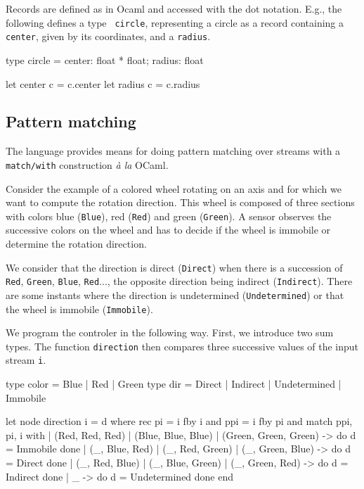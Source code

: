 \documentclass[11pt,titlepage,twoside]{report}
\newcommand{\ocaml}{{\sf OCaml}}
\begin{document}
Records are defined as in Ocaml and accessed with the dot notation. E.g.,
the following defines a type {\tt
  circle}, representing a circle as a record containing a {\tt
  center}, given by its coordinates, and a {\tt radius}.
\begin{chklisting}
type circle = { center: float * float; radius: float }

let center c = c.center
let radius c = c.radius
\end{chklisting}
  
\subsection{Pattern matching\label{patternmatch}} %

The language provides means for doing pattern matching over streams
with a \verb-match/with- construction {\em \`a la} \ocaml.

Consider the example of a colored wheel rotating on an axis and for
which we want to compute the rotation direction. This wheel is
composed of three sections with colors blue (\verb-Blue-), red
(\verb-Red-) and green (\verb-Green-).  A sensor observes the
successive colors on the wheel and has to decide if the wheel is
immobile or determine the rotation direction.

We consider that the direction is direct (\verb-Direct-) when there is
a succession of \verb-Red-, \verb-Green-, \verb-Blue-, \verb-Red-...,
the opposite direction being indirect (\verb-Indirect-). There are
some instants where the direction is undetermined
(\verb-Undetermined-) or that the wheel is immobile (\verb-Immobile-).

We program the controler in the following way. First, we introduce two
sum types.  The function \verb-direction- then compares three
successive values of the input stream \verb-i-.
\begin{chklisting}
type color = Blue | Red | Green
type dir = Direct | Indirect | Undetermined | Immobile
\end{chklisting}
%
\begin{chklisting}
let node direction i = d where
  rec pi = i fby i
  and ppi = i fby pi
  and match ppi, pi, i with
  | (Red, Red, Red) | (Blue, Blue, Blue) | (Green, Green, Green) ->
         do d = Immobile done
  | (_, Blue, Red) | (_, Red, Green) | (_, Green, Blue) -> 
         do d = Direct done
  | (_, Red, Blue) | (_, Blue, Green) | (_, Green, Red) -> 
         do d = Indirect done
  | _ -> do d = Undetermined done
  end
\end{chklisting}
\end{document}
